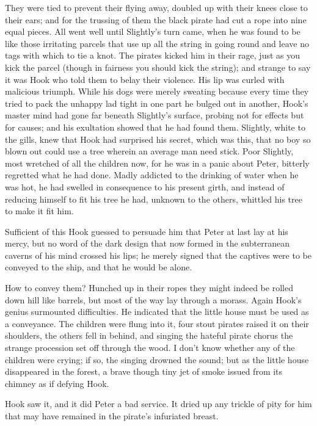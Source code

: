 They were tied to prevent their flying away, doubled up with their knees
close to their ears; and for the trussing of them the black pirate had cut
a rope into nine equal pieces. All went well until Slightly's turn came,
when he was found to be like those irritating parcels that use up all the
string in going round and leave no tags with which to tie a knot.
The pirates kicked him in their rage, just as you kick the parcel (though
in fairness you should kick the string); and strange to say it was Hook
who told them to belay their violence. His lip was curled with malicious
triumph. While his dogs were merely sweating because every time they tried
to pack the unhappy lad tight in one part he bulged out in another, Hook's
master mind had gone far beneath Slightly's surface, probing not for
effects but for causes; and his exultation showed that he had found them.
Slightly, white to the gills, knew that Hook had surprised
his secret, which was this, that no boy so blown out could use a tree
wherein an average man need stick. Poor Slightly, most wretched of all the
children now, for he was in a panic about Peter, bitterly regretted what
he had done. Madly addicted to the drinking of water when he was hot, he
had swelled in consequence to his present girth, and instead of reducing
himself to fit his tree he had, unknown to the others, whittled his tree
to make it fit him.


Sufficient of this Hook guessed to persuade him that Peter at last lay at
his mercy, but no word of the dark design that now formed in the
subterranean caverns of his mind crossed his lips; he merely signed that
the captives were to be conveyed to the ship, and that he would be alone.


How to convey them? Hunched up in their ropes they might indeed be rolled
down hill like barrels, but most of the way lay through a morass. Again
Hook's genius surmounted difficulties. He indicated that the little house
must be used as a conveyance. The children were flung into it, four stout
pirates raised it on their shoulders, the others fell in behind, and
singing the hateful pirate chorus the strange procession set off through
the wood. I don't know whether any of the children were crying; if so, the
singing drowned the sound; but as the little house disappeared in the
forest, a brave though tiny jet of smoke issued from its chimney as if
defying Hook.


Hook saw it, and it did Peter a bad service. It dried up any trickle of
pity for him that may have remained in the pirate's infuriated breast.



